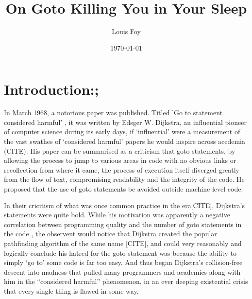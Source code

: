 \documentclass{journal}
\title{On Goto Killing You in Your Sleep}
\author{Louis Foy}
\date{\today}
\begin{document}
\maketitle


\section{\textunderscore \textunderscore Introduction:;}
In March 1968, a notorious paper was published. Titled 'Go to statement considered harmful' \cite{goto}, it was written by Edsger W. Dijkstra, an influential pioneer of computer science during its early days, if `influential' were a measurement of the vast swathes of `considered harmful' papers he would inspire across acedemia (CITE). His paper can be summarised as a criticism that goto statements, by allowing the process to jump to various areas in code with no obvious links or recollection from where it came, the process of execution itself diverged greatly from the flow of text, compromising readability and the integrity of the code. He proposed that the use of goto statements be avoided outside machine level code.

In their cricitism of what was once common practice in the era[CITE], Dijkstra's statements were quite bold. While his motivation was apparently a negative correlation between programming quality and the number of goto statements in the code \cite{goto}, the observent would notice that Dijkstra created the popular pathfinding algorithm of the same name [CITE], and could very reasonably and logically conclude his hatred for the goto statement was because the ability to simply `go to' some code is far too easy. And thus began Dijkstra's collision-free descent into madness that pulled many programmers and academics along with him in the ``considered harmful'' phenomenon, in an ever deeping existential crisis that every single thing is flawed in some way.
\end{document}
